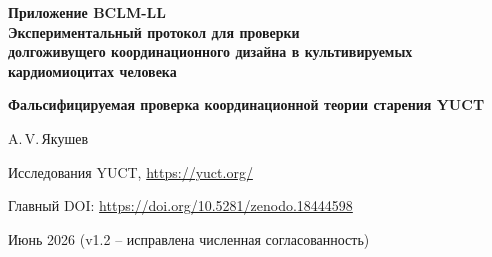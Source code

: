 \documentclass[12pt,a4paper]{article}
\newcommand{\REL}{\mathcal{K}}          %
\begin{document}
	
	\begin{titlepage}
		\centering
		\vspace*{2cm}
		{\Huge\bfseries Приложение BCLM-LL\\[0.3cm]
			Экспериментальный протокол для проверки\\долгоживущего координационного дизайна в культивируемых кардиомиоцитах человека\par}
		\vspace{0.5cm}
		{\Large\bfseries Фальсифицируемая проверка координационной теории старения YUCT\par}
		\vspace{1.5cm}
		{\large A.\,V.\,Якушев\par}
		{\normalsize Исследования YUCT, \url{https://yuct.org/}\par}
		\vspace{0.5cm}
		{\normalsize Главный DOI: \url{https://doi.org/10.5281/zenodo.18444598}\par}
		\vspace{0.5cm}
		{\normalsize Июнь 2026 (v1.2 – исправлена численная согласованность)\par}
		\vfill
		\begin{abstract}
			\noindent
			Объединённая теория координации Якушева (YUCT) объясняет старение как прогрессирующее снижение эффективности координации \(K_{\mathrm{eff}}\) клеточных подсистем. Биологический лагранжиан координации (BCLM, Приложение BCLM) предоставляет математическую основу для вычисления \(K_{\mathrm{eff}}\) по последовательностям и для конструирования генетических вмешательств, восстанавливающих её до ювенильного уровня. Данный протокол описывает полный, самодостаточный эксперимент по проверке долгоживущего координационного дизайна в культивируемых кардиомиоцитах человека. Мы указываем точные гены, подлежащие модификации, вычисляем их нативную и оптимизированную относительную эффективность координации \(\REL\), выводим количественные предсказания для частоты мутаций, окислительного стресса, агрегации белков, скорости миграции и клеточной продолжительности жизни непосредственно из универсального закона ошибок \(\varepsilon = \kappa_c \alpha \REL^{-\beta}\) (\(\beta=2/3\), \(\kappa_c=1/3\)), и предоставляем пошаговый экспериментальный график. Включён модуль контролируемой регрессии (CCR) для демонстрации обратимости стареющего фенотипа. Все предсказания предварительно зарегистрированы и фальсифицируемы с помощью стандартных методов клеточной биологии. По этическим соображениям протокол намеренно опускает методы \textit{in vivo} доставки; читатель отсылается к Приложению~\(\Sigma\).
		\end{abstract}
	\end{titlepage}
	
\end{document}
